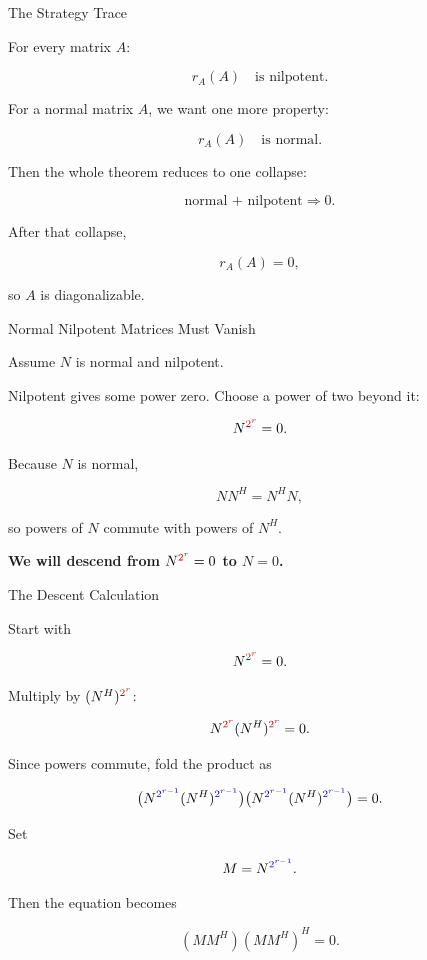 \documentclass[10pt]{beamer}
\theoremstyle{definition}
\newcommand{\x}[1]{\alert{\textbf{#1}}}
\newcommand{\rd}[1]{{\color{red!70!black}#1}}
\newcommand{\bl}[1]{{\color{blue!70!black}#1}}
\begin{document}
\begin{frame}[shrink=8]{The Strategy Trace}

For every matrix $A$:

$$
r_A(A)\quad\text{is nilpotent.}
$$

\vfill\pause

For a normal matrix $A$, we want one more property:

$$
r_A(A)\quad\text{is normal.}
$$

\vfill\pause

Then the whole theorem reduces to one collapse:

$$
\boxed{\text{normal + nilpotent} \Longrightarrow 0.}
$$

\vfill

After that collapse,

$$
r_A(A)=0,
$$

so $A$ is diagonalizable.

\end{frame}


\begin{frame}{Normal Nilpotent Matrices Must Vanish}

Assume $N$ is normal and nilpotent.

\vfill

Nilpotent gives some power zero. Choose a power of two beyond it:

$$
N^{\rd{2^r}}=0.
$$

\vfill\pause

Because $N$ is normal,

$$
NN^H=N^HN,
$$

so powers of $N$ commute with powers of $N^H$.

\vfill

\x{We will descend from $N^{\rd{2^r}}=0$ to $N=0$.}

\end{frame}


\begin{frame}[shrink=7]{The Descent Calculation}

Start with

$$
N^{\rd{2^r}}=0.
$$

\vfill

Multiply by $(N^H)^{\rd{2^r}}$:

$$
N^{\rd{2^r}}(N^H)^{\rd{2^r}}=0.
$$

\vfill\pause

Since powers commute, fold the product as

$$
\bigl(N^{\bl{2^{r-1}}}(N^H)^{\bl{2^{r-1}}}\bigr)
\bigl(N^{\bl{2^{r-1}}}(N^H)^{\bl{2^{r-1}}}\bigr)=0.
$$

\vfill

Set

$$
M=N^{\bl{2^{r-1}}}.
$$

Then the equation becomes

$$
(MM^H)(MM^H)^H=0.
$$

\end{frame}
\end{document}
